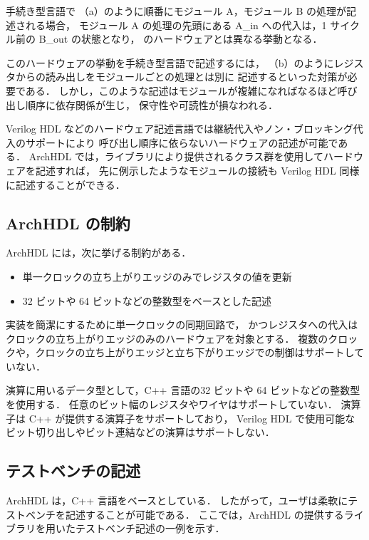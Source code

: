 手続き型言語で
（a）のように順番にモジュール A，モジュール B の処理が記述される場合，
モジュール A の処理の先頭にある A\_in への代入は，1 サイクル前の B\_out の状態となり，
のハードウェアとは異なる挙動となる．

このハードウェアの挙動を手続き型言語で記述するには，
（b）のようにレジスタからの読み出しをモジュールごとの処理とは別に
記述するといった対策が必要である．
しかし，このような記述はモジュールが複雑になればなるほど呼び出し順序に依存関係が生じ，
保守性や可読性が損なわれる．

Verilog HDL などのハードウェア記述言語では継続代入やノン・ブロッキング代入のサポートにより
呼び出し順序に依らないハードウェアの記述が可能である．
ArchHDL では，ライブラリにより提供されるクラス群を使用してハードウェアを記述すれば，
先に例示したようなモジュールの接続も Verilog HDL 同様に記述することができる．


\subsection{ArchHDL の制約}

ArchHDL には，次に挙げる制約がある．

\begin{itemize}
 \item 単一クロックの立ち上がりエッジのみでレジスタの値を更新
 \item 32 ビットや 64 ビットなどの整数型をベースとした記述
\end{itemize}

実装を簡潔にするために単一クロックの同期回路で，
かつレジスタへの代入はクロックの立ち上がりエッジのみのハードウェアを対象とする．
複数のクロックや，クロックの立ち上がりエッジと立ち下がりエッジでの制御はサポートしていない．

演算に用いるデータ型として，C++ 言語の32 ビットや 64 ビットなどの整数型を使用する．
任意のビット幅のレジスタやワイヤはサポートしていない．
演算子は C++ が提供する演算子をサポートしており，
Verilog HDL で使用可能なビット切り出しやビット連結などの演算はサポートしない．


\subsection{テストベンチの記述}

ArchHDL は，C++ 言語をベースとしている．
したがって，ユーザは柔軟にテストベンチを記述することが可能である．
ここでは，ArchHDL の提供するライブラリを用いたテストベンチ記述の一例を示す．

